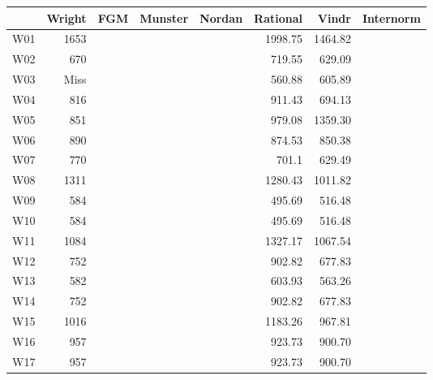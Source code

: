 \begin{tabular}{|p{4cm}||r|r|r|r|r|r|r|}
\hline
\rowcolor{LightCyan}
            &Wright     &FGM       &Munster &Nordan  &Rational   &Vindr  &Internorm         
\\ \hline
W01         &1653       &          &        &        &1998.75    &1464.82&                        
\\ \hline
W02         &670        &          &        &        &719.55     &629.09 &                            
\\ \hline
W03         &Miss       &          &        &        &560.88     &605.89 &                            
\\ \hline
W04         &816        &          &        &        &911.43     &694.13 &                     
\\ \hline
W05         &851        &          &        &        &979.08     &1359.30&                    
\\ \hline
W06         &890        &          &        &        &874.53     &850.38 &                    
\\ \hline
W07         &770        &          &        &        &701.1      &629.49 &                    
\\ \hline
W08         &1311       &          &        &        &1280.43    &1011.82&                     
\\ \hline
W09         &584        &          &        &        &495.69     &516.48 &                    
\\ \hline
W10         &584        &          &        &        &495.69     &516.48 &                     
\\ \hline
W11         &1084       &          &        &        &1327.17    &1067.54&                     
\\ \hline
W12         &752        &          &        &        &902.82     &677.83 &               
\\ \hline
W13         &582        &          &        &        &603.93     &563.26 &                   
\\ \hline
W14         &752        &          &        &        &902.82     &677.83 &                    
\\ \hline
W15         &1016       &          &        &        &1183.26    &967.81 &                     
\\ \hline
W16         &957        &          &        &        &923.73     &900.70 &                    
\\ \hline
W17         &957        &          &        &        &923.73     &900.70 &                    

\end{tabular}

